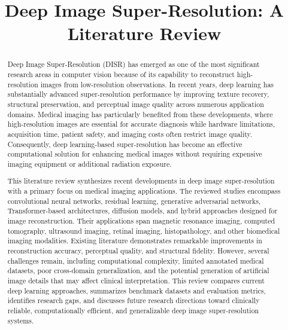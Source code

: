 \documentclass[conference]{IEEEtran}
\begin{document}
\title{Deep Image Super-Resolution: A Literature Review}

\author{%
%
}

\maketitle

\begin{abstract}
Deep Image Super-Resolution (DISR) has emerged as one of the most significant research areas in computer vision because of its capability to reconstruct high-resolution images from low-resolution observations. In recent years, deep learning has substantially advanced super-resolution performance by improving texture recovery, structural preservation, and perceptual image quality across numerous application domains. Medical imaging has particularly benefited from these developments, where high-resolution images are essential for accurate diagnosis while hardware limitations, acquisition time, patient safety, and imaging costs often restrict image quality. Consequently, deep learning-based super-resolution has become an effective computational solution for enhancing medical images without requiring expensive imaging equipment or additional radiation exposure.

This literature review synthesizes recent developments in deep image super-resolution with a primary focus on medical imaging applications. The reviewed studies encompass convolutional neural networks, residual learning, generative adversarial networks, Transformer-based architectures, diffusion models, and hybrid approaches designed for image reconstruction. Their applications span magnetic resonance imaging, computed tomography, ultrasound imaging, retinal imaging, histopathology, and other biomedical imaging modalities. Existing literature demonstrates remarkable improvements in reconstruction accuracy, perceptual quality, and structural fidelity. However, several challenges remain, including computational complexity, limited annotated medical datasets, poor cross-domain generalization, and the potential generation of artificial image details that may affect clinical interpretation. This review compares current deep learning approaches, summarizes benchmark datasets and evaluation metrics, identifies research gaps, and discusses future research directions toward clinically reliable, computationally efficient, and generalizable deep image super-resolution systems.
\end{abstract}
\end{document}
